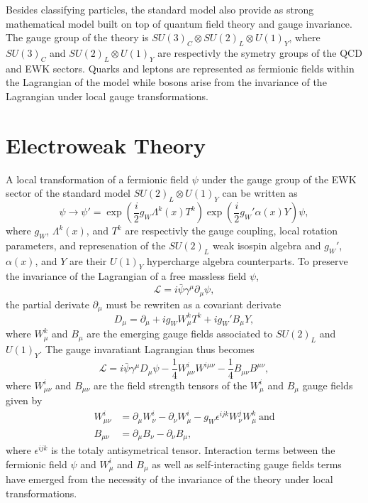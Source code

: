   Besides classifying particles, the standard model also provide as strong mathematical model built on top of quantum field theory and gauge invariance. The gauge group of the theory is $ SU(3)_C \otimes SU(2)_L \otimes U(1)_Y $, where $ SU(3)_C $ and $ SU(2)_L \otimes U(1)_Y $ are respectivly the symetry groups of the QCD and EWK sectors. Quarks and leptons are represented as fermionic fields within the Lagrangian of the model while bosons arise from the invariance of the Lagrangian under local gauge transformations.

  \section{Electroweak Theory}

    A local transformation of a fermionic field $ \psi $ under the gauge group of the EWK sector of the standard model $ SU(2)_L \otimes U(1)_Y $ can be written as
    \begin{equation}
      \psi \rightarrow \psi' = \exp\left( \frac{i}{2} g_W \Lambda^k(x) T^k \right) \exp\left( \frac{i}{2} g_W' \alpha(x) Y \right) \psi ,
    \end{equation}
    where $ g_W $, $ \Lambda^k(x) $, and $ T^k $ are respectivly the gauge coupling, local rotation parameters, and represenation of the $ SU(2)_L $ weak isospin algebra and $ g_W' $, $ \alpha(x) $, and $ Y $ are their $ U(1)_Y $ hypercharge algebra counterparts. To preserve the invariance of the Lagrangian of a free massless field $ \psi $,
    \begin{equation}
      \mathcal{L} = i \bar{\psi} \gamma^\mu \partial_\mu \psi ,
    \end{equation}
    the partial derivate $ \partial_\mu $ must be rewriten as a covariant derivate
    \begin{equation}
      D_\mu = \partial_\mu + i g_W W^k_\mu T^k + i g_W' B_\mu Y ,
    \end{equation}
    where $ W^k_\mu $ and $ B_\mu$ are the emerging gauge fields associated to $ SU(2)_L $ and $ U(1)_Y $. The gauge invaratiant Lagrangian thus becomes
    \begin{equation}
      \mathcal{L} = i \bar{\psi} \gamma^\mu D_\mu \psi - \frac{1}{4} W^i_{\mu \nu} W^{i \mu \nu} - \frac{1}{4} B_{\mu \nu} B^{\mu \nu} ,
    \end{equation}
    where $ W^i_{\mu \nu} $ and $ B_{\mu \nu} $ are the field strength tensors of the $ W^i_\mu $ and $ B_\mu $ gauge fields given by
    \begin{align}
      W^i_{\mu \nu} & = \partial_\mu W^i_\nu - \partial_\nu W^i_\mu - g_W \epsilon^{ijk} W^j_\nu W^k_\mu \ \text{and} \\
      B_{\mu \nu} & = \partial_\mu B_\nu - \partial_\nu B_\mu ,
    \end{align}
    where $ \epsilon^{ijk} $ is the totaly antisymetrical tensor. Interaction terms between the fermionic field $ \psi $ and $ W^i_\mu $ and $ B_\mu $ as well as self-interacting gauge fields terms have emerged from the necessity of the invariance of the theory under local transformations. \\

